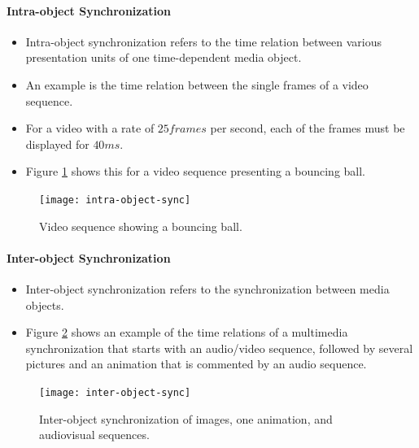 \paragraph*{Intra-object Synchronization}
\begin{multicols}{2}
	\begin{itemize}
		\item Intra-object synchronization refers to the time relation between various presentation units of one time-dependent media object. 
		\item An example is the time relation between the single frames of a video sequence. 
		\item For a video with a rate of $ 25 frames $ per second, each of the frames must be displayed for $ 40 ms $.
		\item Figure {\ref{fig:intra-object-sync}} shows this for a video sequence presenting a bouncing ball.
	\end{itemize}
\end{multicols}


\begin{figure}[ht!]
	\centering
	\texttt{[image: intra-object-sync]}
	\caption{Video sequence showing a bouncing ball.}\label{fig:intra-object-sync}
\end{figure}


\begin{multicols}{2}
	\paragraph*{Inter-object Synchronization}
	\begin{itemize}
		\item Inter-object synchronization refers to the synchronization between media objects. 
		\item Figure {\ref{fig:inter-object-sync}} shows an example of the time	relations of a multimedia synchronization that starts with an audio/video sequence, followed by several pictures and an animation that is commented by an audio sequence.
	\end{itemize}
\end{multicols}



\begin{figure}[ht!]
	\centering
	\texttt{[image: inter-object-sync]}
	\caption{Inter-object synchronization of images, one animation, and audiovisual	sequences.}\label{fig:inter-object-sync}
\end{figure}



